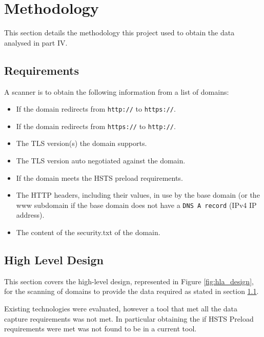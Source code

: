 \documentclass{mscreport}
\begin{document}
\section{Methodology}
\label{section:methodology}

This section details the methodology this project used to obtain the data analysed in part IV.

\subsection{Requirements}
\label{subsection:requirements}

A scanner is to obtain the following information from a list of domains:

\begin{itemize}
	\setlength\itemsep{0.1em}
    \item If the domain redirects from \texttt{http://} to \texttt{https://}.
    \item If the domain redirects from \texttt{https://} to \texttt{http://}.
    \item The TLS version(s) the domain supports.
    \item The TLS version auto negotiated against the domain.
    \item If the domain meets the HSTS preload requirements.
    \item The HTTP headers, including their values, in use by the base domain (or the www subdomain if the base domain does not have a \texttt{DNS A record} (IPv4 IP address).
    \item The content of the security.txt of the domain.
\end{itemize}

\subsection{High Level Design}
\label{subsection:hld}

This section covers the high-level design, represented in Figure \ref{fig:hla_design}, for the scanning of domains to provide the data required as stated in section
\ref{subsection:requirements}.

\vspace{0.3cm} \noindent
Existing technologies were evaluated, however a tool that met all the data capture requirements was not met. In particular obtaining the if HSTS Preload requirements were met was not found to be in a current tool.

\end{document}
